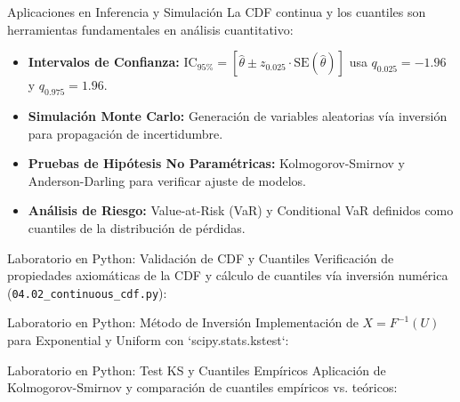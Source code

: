 \documentclass[10pt, aspectratio=169]{beamer}
\begin{document}
\begin{frame}{Aplicaciones en Inferencia y Simulación}
  \footnotesize
  La CDF continua y los cuantiles son herramientas fundamentales en análisis cuantitativo: \pause

  \vspace{0.15cm}
  \begin{itemize}\itemsep=0.12cm
    \item \textbf{Intervalos de Confianza:} $\text{IC}_{95\%} = [\hat{\theta} \pm z_{0.025} \cdot \text{SE}(\hat{\theta})]$ usa $q_{0.025} = -1.96$ y $q_{0.975} = 1.96$. \pause
    \item \textbf{Simulación Monte Carlo:} Generación de variables aleatorias vía inversión para propagación de incertidumbre. \pause
    \item \textbf{Pruebas de Hipótesis No Paramétricas:} Kolmogorov-Smirnov y Anderson-Darling para verificar ajuste de modelos. \pause
    \item \textbf{Análisis de Riesgo:} Value-at-Risk (VaR) y Conditional VaR definidos como cuantiles de la distribución de pérdidas.
  \end{itemize}
\end{frame}

\begin{frame}[fragile]{Laboratorio en Python: Validación de CDF y Cuantiles}
  \scriptsize
  Verificación de propiedades axiomáticas de la CDF y cálculo de cuantiles vía inversión numérica (\texttt{04.02\_continuous\_cdf.py}):
  \vspace{0.02cm}
  {
  }
\end{frame}

\begin{frame}[fragile]{Laboratorio en Python: Método de Inversión}
  \scriptsize
  Implementación de $X = F^{-1}(U)$ para Exponential y Uniform con `scipy.stats.kstest`:
  \vspace{0.02cm}
  {
  }
\end{frame}

\begin{frame}[fragile]{Laboratorio en Python: Test KS y Cuantiles Empíricos}
  \scriptsize
  Aplicación de Kolmogorov-Smirnov y comparación de cuantiles empíricos vs. teóricos:
  \vspace{0.02cm}
  {
  }
\end{frame}
\end{document}
